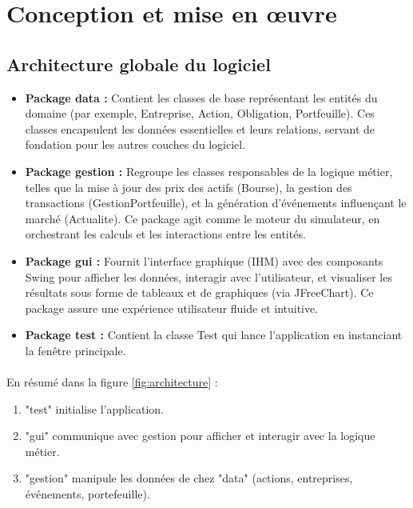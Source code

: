 \newpage
\section{Conception et mise en œuvre}
\label{sec:impl}

\subsection{Architecture globale du logiciel}


\begin{itemize}


    \item \textbf{Package data :} Contient les classes de base représentant les entités du domaine (par exemple, Entreprise,
Action, Obligation, Portfeuille). Ces classes encapsulent les données essentielles et leurs relations,
servant de fondation pour les autres couches du logiciel.


\item \textbf{Package gestion :} Regroupe les classes responsables de la logique métier, telles que la mise à jour des prix
des actifs (Bourse), la gestion des transactions (GestionPortfeuille), et la génération d'événements
influençant le marché (Actualite). Ce package agit comme le moteur du simulateur, en orchestrant les calculs
et les interactions entre les entités.


\item \textbf{Package gui :} Fournit l'interface graphique (IHM) avec des composants Swing pour afficher les données,
interagir avec l'utilisateur, et visualiser les résultats sous forme de tableaux et de graphiques (via JFreeChart). Ce
package assure une expérience utilisateur fluide et intuitive.


\item \textbf{Package test :} Contient la classe Test qui lance l'application en instanciant la fenêtre principale.
\end{itemize}





\paragraph{} En résumé dans la figure \ref{fig:architecture} :
\begin{enumerate}
    \item "test" initialise l’application.

    \item "gui" communique avec gestion pour afficher et interagir avec la logique métier.

    \item "gestion" manipule les données de chez "data" (actions, entreprises, événements, portefeuille).
\end{enumerate}

